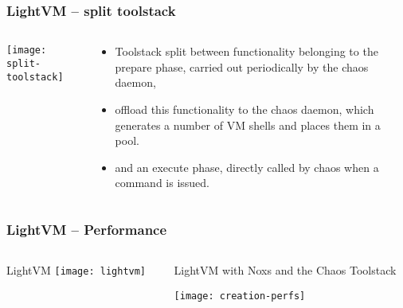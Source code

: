\begin{frame}[plain]
	\frametitle{LightVM -- split toolstack }
	
	
	
	\begin{columns}
		
		\begin{column}{.6\textwidth}
			
			
			\centering
			\texttt{[image: split-toolstack]}
			
		\end{column}
		
		\begin{column}{.4\textwidth}
			
			\begin{itemize}			
				\item Toolstack split between functionality belonging to the prepare phase, carried out periodically
				by the chaos daemon,
				\item offload this functionality to the chaos daemon, which generates a number
				of VM shells and places them in a pool. 
				\item and an execute phase, directly
				called by chaos when a command is issued.
				
				
				
			\end{itemize}
			
			
		\end{column}
		
		
	\end{columns}
	
	
\end{frame}



\begin{frame}[plain]
	\frametitle{LightVM -- Performance}
	
	
	
	\begin{columns}
		
		\begin{column}{.3\textwidth}
			\centering LightVM
			\texttt{[image: lightvm]}
			
		\end{column}
		
		\begin{column}{.7\textwidth}
			LightVM with Noxs and the Chaos
			Toolstack
			
			\centering
			\texttt{[image: creation-perfs]}
			
			
		\end{column}
		
		
	\end{columns}
	
	
\end{frame}


